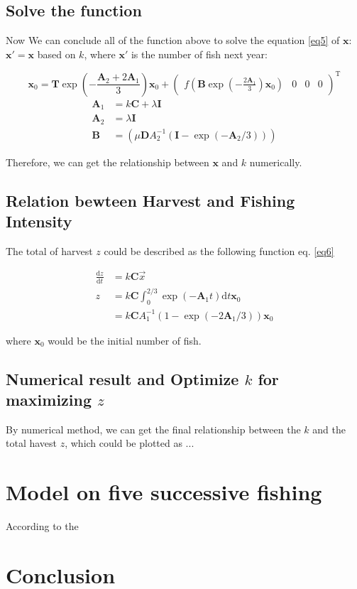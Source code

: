 \subsection{Solve the function}

Now We can conclude all of the function above to solve the equation \ref{eq5} of $\bm x$: $\bm x' = \bm x$ based on $k$, where $\bm x'$ is the number of fish next year:  

\begin{equation}
    \label{eq5}
    \bm x_0 = \mathbf T \exp(-\frac{\mathbf A_2 + 2 \mathbf A_1}{3})\bm x_0 +\begin{pmatrix} f(\mathbf B \exp(-\frac{2\mathbf A_1}{3})\bm x_0)&0&0&0\end{pmatrix}^{\mathrm T}
\end{equation}
\begin{align}
    \mathbf A_1 &= k\mathbf C + \lambda \mathbf I\\
    \mathbf A_2 &= \lambda \mathbf I\\
    \mathbf B &= (\mu \mathbf D A_2^{-1}(\mathbf I - \exp(-\mathbf A_2/3)))
\end{align}

Therefore, we can get the relationship between $\bm x$ and $k$ numerically.
\subsection{Relation bewteen Harvest and Fishing Intensity}
The total of harvest $z$ could be described as the following function eq. \ref{eq6}

\begin{align}
    \label{eq6}
    \frac {\mathrm dz}{\mathrm dt} &= k\mathbf C \vec x\\
    z &= k\mathbf C\int_0^{2/3}\exp(-\mathbf A_1t)\mathrm dt\bm x_0 \\ 
    &= k\mathbf C  A_1^{-1} (1-\exp(-2\mathbf A_1/3))\bm x_0
\end{align}

where $\bm x_0$ would be the initial number of fish.

\subsection{Numerical result and Optimize $k$ for maximizing $z$}

By numerical method, we can get the final relationship between the $k$ and the total havest $z$, which could be plotted as ...

%
%
\section{Model on five successive fishing}

According to the 




\section{Conclusion}
